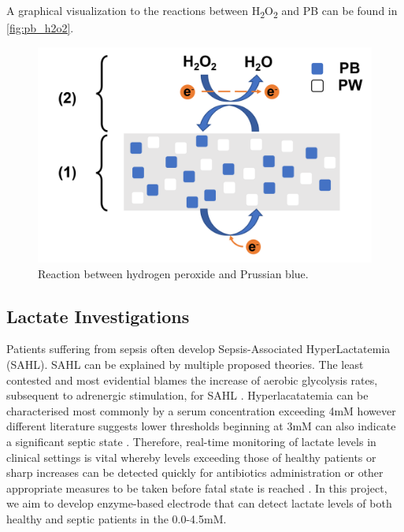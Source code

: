 \noindent A graphical visualization to the reactions between H\textsubscript{2}O\textsubscript{2} and PB can be found in \autoref{fig:pb_h2o2}.
\begin{figure}[H]
    \centering
    \includegraphics[width=.5\textwidth]{img/pb_h2o2.png}
    \caption{Reaction between hydrogen peroxide and Prussian blue.}
    \label{fig:pb_h2o2}
\end{figure}
\subsection{Lactate Investigations}
Patients suffering from sepsis often develop Sepsis-Associated HyperLactatemia (SAHL). SAHL can be explained by multiple proposed theories. The least contested and most evidential blames the increase of aerobic glycolysis rates, subsequent to adrenergic stimulation, for SAHL \cite{garcia2014sepsis}.
Hyperlacatatemia can be characterised most commonly by a serum concentration exceeding 4mM however different literature suggests lower thresholds beginning at 3mM can also indicate a significant septic state \cite{singer2014ed}.
Therefore, real-time monitoring of lactate levels in clinical settings is vital whereby levels exceeding those of healthy patients or sharp increases can be detected quickly for antibiotics administration or other appropriate measures to be taken before fatal state is reached \cite{gyawali2019sepsis}.
In this project, we aim to develop enzyme-based electrode that can detect lactate levels of both healthy and septic patients in the 0.0-4.5mM.

